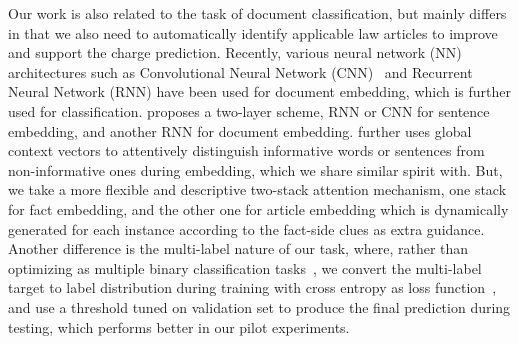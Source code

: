 Our work is also related to the task of document classification, but mainly differs in that we also need to automatically identify applicable law articles to improve and support the charge prediction.
Recently, various neural network (NN) architectures such as Convolutional Neural Network (CNN)~\cite{kim2014convolutional} and Recurrent Neural Network (RNN) have been used for document embedding, which is further used for classification.
\cite{tang2015document} proposes a two-layer scheme, RNN or CNN for sentence embedding, and another RNN for document embedding.
\cite{yang2016hierarchical} further uses global context vectors to attentively distinguish informative words or sentences from non-informative ones during embedding, which we share similar spirit with. 
But, we take a more flexible and descriptive two-stack attention mechanism, one stack for fact embedding, and the other one for article embedding which is  dynamically generated for each instance according to the fact-side clues as extra guidance.
%
Another difference is the multi-label nature of our task, where, rather than optimizing as multiple binary classification tasks~\cite{nam2014large}, 
we convert the multi-label target to label distribution during training with cross entropy as loss function~\cite{kurata2016improved}, and use a threshold tuned on validation set to produce the final prediction during testing, which performs better  in our pilot experiments.
